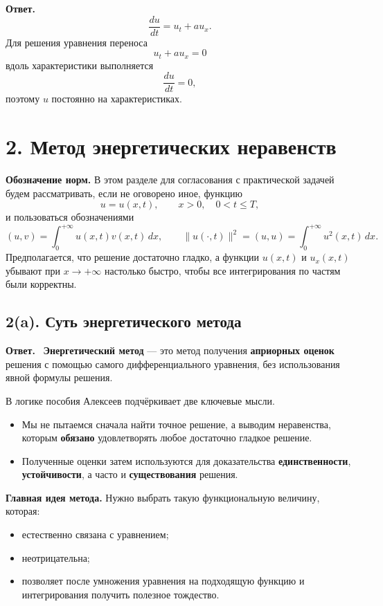 \documentclass[a4paper,12pt]{article}
\newcommand{\Answer}{\textbf{Ответ.}\ }
\begin{document}
\textbf{Ответ.}
\[
\frac{du}{dt}=u_t+a u_x.
\]
Для решения уравнения переноса
\[
u_t+a u_x=0
\]
вдоль характеристики выполняется
\[
\frac{du}{dt}=0,
\]
поэтому $u$ постоянно на характеристиках.

\section*{2. Метод энергетических неравенств}

\textbf{Обозначение норм.} В этом разделе для согласования с практической задачей будем рассматривать, если не оговорено иное, функцию
\[
u=u(x,t), \qquad x>0, \quad 0<t\le T,
\]
и пользоваться обозначениями
\[
(u,v)=\int_0^{+\infty}u(x,t)v(x,t)\,dx,
\qquad
\|u(\cdot,t)\|^2=(u,u)=\int_0^{+\infty}u^2(x,t)\,dx.
\]
Предполагается, что решение достаточно гладко, а функции $u(x,t)$ и $u_x(x,t)$ убывают при $x\to+\infty$ настолько быстро, чтобы все интегрирования по частям были корректны.

\subsection*{2(a). Суть энергетического метода}

\Answer
\textbf{Энергетический метод} --- это метод получения \textbf{априорных оценок} решения с помощью самого дифференциального уравнения, без использования явной формулы решения.

В логике пособия Алексеев подчёркивает две ключевые мысли.
\begin{itemize}
  \item Мы не пытаемся сначала найти точное решение, а выводим неравенства, которым \textbf{обязано} удовлетворять любое достаточно гладкое решение.
  \item Полученные оценки затем используются для доказательства \textbf{единственности}, \textbf{устойчивости}, а часто и \textbf{существования} решения.
\end{itemize}

\textbf{Главная идея метода.} Нужно выбрать такую функциональную величину, которая:
\begin{itemize}
  \item естественно связана с уравнением;
  \item неотрицательна;
  \item позволяет после умножения уравнения на подходящую функцию и интегрирования получить полезное тождество.
\end{itemize}
\end{document}
